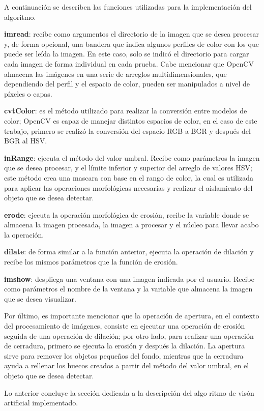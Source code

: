 A continuación se describen las funciones utilizadas para la implementación del algoritmo.

\textbf{imread}: recibe como argumentos el directorio de la imagen que se desea procesar y, de forma opcional, una bandera que indica algunos perfiles de color con los que puede ser leída la imagen. En este caso, solo se indicó el directorio para cargar cada imagen de forma individual en cada prueba. Cabe mencionar que OpenCV almacena las imágenes en una serie de arreglos multidimensionales, que dependiendo del perfil y el espacio de color, pueden ser manipulados a nivel de píxeles o capas.

\textbf{cvtColor}: es el método utilizado para realizar la conversión entre modelos de color; OpenCV es capaz de manejar distintos espacios de color, en el caso de este trabajo, primero se realizó la conversión del espacio RGB a BGR y después del BGR al HSV.

\textbf{inRange}: ejecuta el método del valor umbral. Recibe como parámetros la imagen que se desea procesar, y el límite inferior y superior del arreglo de valores HSV; este método crea una mascara con base en el rango de color, la cual es utilizada para aplicar las operaciones morfológicas necesarias y realizar el aislamiento del objeto que se desea detectar.

\textbf{erode}: ejecuta la operación morfológica de erosión, recibe la variable donde se almacena la imagen procesada, la imagen a procesar y el núcleo para llevar acabo la operación.

\textbf{dilate}: de forma similar a la función anterior, ejecuta la operación de dilación y recibe los mismos parámetros que la función de erosión.

\textbf{imshow}: despliega una ventana con una imagen indicada por el usuario. Recibe como parámetros el nombre de la ventana y la variable que almacena la imagen que se desea visualizar.

Por último, es importante mencionar que la operación de apertura, en el contexto del procesamiento de imágenes, consiste en ejecutar una operación de erosión seguida de una operación de dilación; por otro lado, para realizar una operación de cerradura, primero se ejecuta la erosión y después la dilación. La apertura sirve para remover los objetos pequeños del fondo, mientras que la cerradura ayuda a rellenar los huecos creados a partir del método del valor umbral, en el objeto que se desea detectar.

Lo anterior concluye la sección dedicada a la descripción del algo  ritmo de visón artificial implementado.
